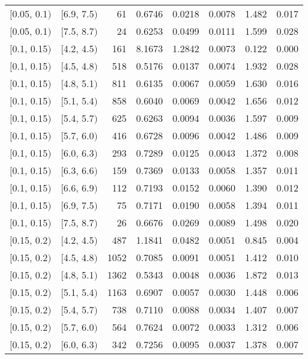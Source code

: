\begin{longtable}{| l | l | r | r | r | r | r | r |}
        $[$0.05, 0.1$)$ & $[$6.9, 7.5$)$ & 61 & 0.6746 & 0.0218 & 0.0078 & 1.482 & 0.017 \\
        $[$0.05, 0.1$)$ & $[$7.5, 8.7$)$ & 24 & 0.6253 & 0.0499 & 0.0111 & 1.599 & 0.028 \\
        $[$0.1, 0.15$)$ & $[$4.2, 4.5$)$ & 161 & 8.1673 & 1.2842 & 0.0073 & 0.122 & 0.000 \\
        $[$0.1, 0.15$)$ & $[$4.5, 4.8$)$ & 518 & 0.5176 & 0.0137 & 0.0074 & 1.932 & 0.028 \\
        $[$0.1, 0.15$)$ & $[$4.8, 5.1$)$ & 811 & 0.6135 & 0.0067 & 0.0059 & 1.630 & 0.016 \\
        $[$0.1, 0.15$)$ & $[$5.1, 5.4$)$ & 858 & 0.6040 & 0.0069 & 0.0042 & 1.656 & 0.012 \\
        $[$0.1, 0.15$)$ & $[$5.4, 5.7$)$ & 625 & 0.6263 & 0.0094 & 0.0036 & 1.597 & 0.009 \\
        $[$0.1, 0.15$)$ & $[$5.7, 6.0$)$ & 416 & 0.6728 & 0.0096 & 0.0042 & 1.486 & 0.009 \\
        $[$0.1, 0.15$)$ & $[$6.0, 6.3$)$ & 293 & 0.7289 & 0.0125 & 0.0043 & 1.372 & 0.008 \\
        $[$0.1, 0.15$)$ & $[$6.3, 6.6$)$ & 159 & 0.7369 & 0.0133 & 0.0058 & 1.357 & 0.011 \\
        $[$0.1, 0.15$)$ & $[$6.6, 6.9$)$ & 112 & 0.7193 & 0.0152 & 0.0060 & 1.390 & 0.012 \\
        $[$0.1, 0.15$)$ & $[$6.9, 7.5$)$ & 75 & 0.7171 & 0.0190 & 0.0058 & 1.394 & 0.011 \\
        $[$0.1, 0.15$)$ & $[$7.5, 8.7$)$ & 26 & 0.6676 & 0.0269 & 0.0089 & 1.498 & 0.020 \\
        $[$0.15, 0.2$)$ & $[$4.2, 4.5$)$ & 487 & 1.1841 & 0.0482 & 0.0051 & 0.845 & 0.004 \\
        $[$0.15, 0.2$)$ & $[$4.5, 4.8$)$ & 1052 & 0.7085 & 0.0091 & 0.0051 & 1.412 & 0.010 \\
        $[$0.15, 0.2$)$ & $[$4.8, 5.1$)$ & 1362 & 0.5343 & 0.0048 & 0.0036 & 1.872 & 0.013 \\
        $[$0.15, 0.2$)$ & $[$5.1, 5.4$)$ & 1163 & 0.6907 & 0.0057 & 0.0030 & 1.448 & 0.006 \\
        $[$0.15, 0.2$)$ & $[$5.4, 5.7$)$ & 738 & 0.7110 & 0.0088 & 0.0034 & 1.407 & 0.007 \\
        $[$0.15, 0.2$)$ & $[$5.7, 6.0$)$ & 564 & 0.7624 & 0.0072 & 0.0033 & 1.312 & 0.006 \\
        $[$0.15, 0.2$)$ & $[$6.0, 6.3$)$ & 342 & 0.7256 & 0.0095 & 0.0037 & 1.378 & 0.007 \\

\end{longtable}
